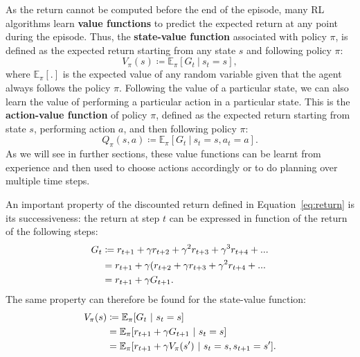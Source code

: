 As the return cannot be computed before the end of the episode, many RL algorithms learn \textbf{value functions} to predict the expected return at any point during the episode. Thus, the \textbf{state-value function} associated with policy $\pi$, is defined as the expected return starting from any state $s$ and following policy $\pi$:
\begin{equation}
    V_\pi(s)\coloneqq\mathbb{E}_\pi[G_t\ |\ s_t=s],
    \label{eq:Value-def}
\end{equation}
where $\mathbb{E}_\pi[.]$ is the expected value of any random variable given that the agent always follows the policy $\pi$. Following the value of a particular state, we can also learn the value of performing a particular action in a particular state. This is the \textbf{action-value function} of policy $\pi$, defined as the expected return starting from state $s$, performing action $a$, and then following policy $\pi$:
\begin{equation}
    Q_\pi(s,a)\coloneqq\mathbb{E}_\pi[G_t\ |\ s_t=s,a_t=a].
    \label{eq:Qvalue-def}
\end{equation}
As we will see in further sections, these value functions can be learnt from experience and then used to choose actions accordingly or to do planning over multiple time steps. 

An important property of the discounted return defined in Equation~\ref{eq:return} is its successiveness: the return at step $t$ can be expressed in function of the return of the following steps:
\begin{align}
    G_t&\coloneqq r_{t+1}+\gamma r_{t+2}+\gamma^2 r_{t+3}+\gamma^3 r_{t+4}+...\notag\\
       &=r_{t+1}+\gamma(r_{t+2}+\gamma r_{t+3}+\gamma^2r_{t+4}+...\notag\\
       &=r_{t+1}+\gamma G_{t+1}.
\end{align}
The same property can therefore be found for the state-value function:
\begin{align}
    V_\pi(s)&\coloneqq\mathbb{E}_\pi[G_t\ |\ s_t=s]\notag\\
       &=\mathbb{E}_\pi[r_{t+1}+\gamma G_{t+1}\ |\ s_t=s]\notag\\
       &=\mathbb{E}_\pi[r_{t+1}+\gamma V_\pi(s')\ |\ s_t=s,s_{t+1}=s'].
\end{align}

